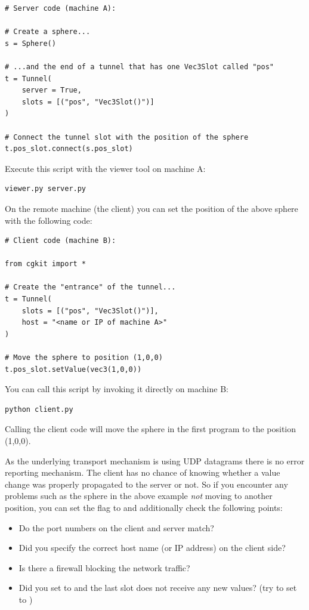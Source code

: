 \begin{verbatim}
# Server code (machine A):

# Create a sphere...
s = Sphere()

# ...and the end of a tunnel that has one Vec3Slot called "pos"
t = Tunnel(
    server = True,
    slots = [("pos", "Vec3Slot()")]
)

# Connect the tunnel slot with the position of the sphere
t.pos_slot.connect(s.pos_slot)
\end{verbatim}

Execute this script with the viewer tool on machine A:

\begin{verbatim}
viewer.py server.py
\end{verbatim}

On the remote machine (the client) you can set the position of the above
sphere with the following code:

\begin{verbatim}
# Client code (machine B):

from cgkit import *

# Create the "entrance" of the tunnel...
t = Tunnel(
    slots = [("pos", "Vec3Slot()")],
    host = "<name or IP of machine A>"
)

# Move the sphere to position (1,0,0)
t.pos_slot.setValue(vec3(1,0,0))
\end{verbatim}

You can call this script by invoking it directly on machine B:

\begin{verbatim}
python client.py
\end{verbatim}

Calling the client code will move the sphere in the first program to 
the position (1,0,0). 

\begin{notice}[note]
As the underlying transport mechanism is using UDP datagrams there is no
error reporting mechanism. The client has no chance of knowing whether
a value change was properly propagated to the server or not. So if you
encounter any problems such as the sphere in the above example {\em not}
moving to another position, you can set the  flag to 
and additionally check the following points:

\begin{itemize}
\item Do the port numbers on the client and server match?
\item Did you specify the correct host name (or IP address) on the client side?
\item Is there a firewall blocking the network traffic?
\item Did you set  to  and the last slot 
  does not receive any new values? (try to set  to
  )
\end{itemize}

\end{notice}
